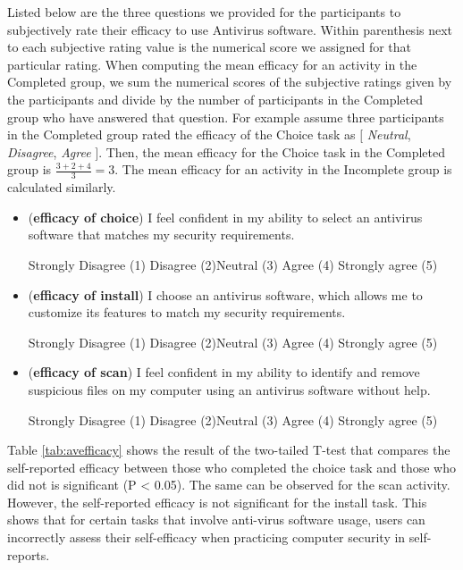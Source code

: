 Listed below are the three questions we provided for the participants to  subjectively rate their efficacy to use Antivirus software.
Within parenthesis next to each subjective rating value is the numerical score we assigned for that particular rating.
When computing the mean efficacy for an activity in the Completed group, we sum the numerical scores of the subjective ratings given by the participants and divide by the number of participants in the Completed group who have answered that question.
For example assume three participants in the Completed group rated the efficacy of the Choice task as $[$ \textit{Neutral}, \textit{Disagree}, \textit{Agree} $]$.
Then, the mean efficacy for the Choice task in the Completed group is $\frac{3 + 2 + 4}{3} = 3$.
The mean efficacy for an activity in the Incomplete group is calculated similarly.
\begin{itemize}
\item (\textbf{efficacy of choice}) I feel confident in my ability to select an antivirus software that matches my security requirements.
\par Strongly Disagree (1) \hspace{0.5cm} Disagree (2)\hspace{0.5cm}Neutral (3)\hspace{0.5cm} Agree (4)\hspace{0.5cm} Strongly agree (5)
\item (\textbf{efficacy of install}) I choose an antivirus software, which allows me to customize its features to match my security requirements.
\par Strongly Disagree (1) \hspace{0.5cm} Disagree (2)\hspace{0.5cm}Neutral (3)\hspace{0.5cm} Agree (4)\hspace{0.5cm} Strongly agree (5)
\item (\textbf{efficacy of scan}) I feel confident in my ability to identify and remove suspicious files on my computer using an antivirus software without help.
\par Strongly Disagree (1) \hspace{0.5cm} Disagree (2)\hspace{0.5cm}Neutral (3)\hspace{0.5cm} Agree (4)\hspace{0.5cm} Strongly agree (5)
\end{itemize}
Table \ref{tab:avefficacy} shows the result of the two-tailed T-test that compares the self-reported efficacy between those who completed the choice task and those who did not is significant (P < 0.05). 
The same can be observed for the scan activity. 
However, the self-reported efficacy is not significant for the install task. This shows that for certain tasks that involve anti-virus software usage, users can incorrectly assess their self-efficacy when practicing computer security in self-reports.

